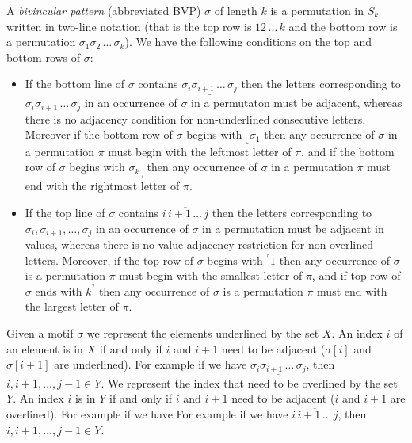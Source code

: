 \documentclass[a4paper]{llncs}
\newcommand{\pmotif}{\sigma}
\newcommand{\x}{X}
\newcommand{\y}{Y}
\begin{document}
A \emph{bivincular pattern} (abbreviated BVP) $\sigma$
of length $k$ is a permutation in $S_k$ written in
two-line notation 
(that is the top row is $12\,\ldots\,k$ and the bottom row
is a permutation $\sigma_1\sigma_2\,\ldots\,\sigma_k$).
We have the following conditions on the top and bottom rows
of $\sigma$:
\begin{itemize}
	\item
	If the bottom line of $\sigma$ contains
	$\underline{\sigma_i\sigma_{i+1}\,\ldots\,\sigma_j}$
	then the letters corresponding to 
	$\sigma_i\sigma_{i+1}\,\ldots\,\sigma_j$ in an occurrence of
	$\sigma$ in a permutaton must be adjacent, whereas there is
	no adjacency condition for
	non-underlined consecutive letters.
	Moreover if the bottom row of $\sigma$ begins with
	$_\llcorner{\sigma_1}$ then any occurrence of $\sigma$ 
	in a permutation $\pi$ must begin with the leftmost 
	letter of $\pi$,
	and 
	if the bottom row of $\sigma$ begins with
	${\sigma_k}_\lrcorner$ then any occurrence of $\sigma$ 
	in a permutation $\pi$ must end with the rightmost 
	letter of $\pi$.
	\item
	If the top line of $\sigma$ contains
	$\overline{i\,i+1\,\ldots\,j}$ then the letters corresponding to
	$\sigma_i, \sigma_{i+1}, \ldots, \sigma_j$ in an
	occurrence of $\sigma$ in a permutation must be adjacent in values,
	whereas there is no value adjacency restriction for non-overlined 
	letters.
	Moreover, if the top row of $\sigma$ begins with
	$^\ulcorner{1}$ then
	any occurrence of $\sigma$ is a permutation $\pi$ must begin with
	the smallest letter of $\pi$, and
	if top row of $\sigma$ ends with $k^\urcorner$ then
	any occurrence of $\sigma$ is a permutation $\pi$ must end with
	the largest letter of $\pi$.
\end{itemize}
Given a motif $\pmotif$ we represent the elements underlined by the set $\x$. An index $i$ of an element is in $\x$ if and only if $i$ and $i+1$ need to be adjacent ($\pmotif[i]$ and $\pmotif[i+1]$ are underlined).
For example if we have $\underline{\sigma_i\sigma_{i+1}\,\ldots\,\sigma_j}$, then ${i,i+1,\ldots,j-1} \in \y$. 
We represent the index that need to be overlined by the set $\y$. An index $i$ is in $\y$ if and only if $i$ and $i+1$ need to be adjacent ($i$ and $i+1$ are overlined).
For example if we have
For example if we have $\overline{i\,i+1\,\ldots\,j}$, then ${i,i+1,\ldots,j-1} \in \y$.
\end{document}
